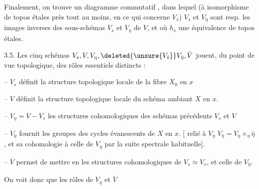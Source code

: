 
Finalement, on trouve un diagramme commutatif 
,
dans lequel  (à isomorphisme de topos étales près tout au moins, en ce qui concerne $V_{\bar s}$) $V_{\bar s}$ et $V_{\bar\eta}$ sont resp. les images inverses des sous-schémas  $V_s$ et $V_\eta$ de $V$,  et où $h_s$   une équivalence de topos étales.

3.5. Les  cinq schémas  $V_s,V,V_\eta,\deleted{\unsure{V_{\bar s}}}V_{\bar\eta},\bar V$ jouent, du point de vue topologique, des rôles essentiels distincts :

 -- $V_s$ définit la structure topologique locale de la fibre $X_0$ en $x$

-- $V$ définit la structure topologique locale du schéma ambiant $X$ en $x$.

-- $V_\eta=V-V_s$   les structures cohomologiques des schémas précédents $V_s$ et $V$

-- $V_{\bar\eta}$ fournit les  groupes des  cycles évanescents de $X$ en $x$. [  relié à $V_\eta$ $V_{\bar\eta}=V_\eta\times_\eta\bar\eta$, et sa cohomologie à celle de $V_\eta$ par la suite  spectrale habituelle].

-- $\bar V$ permet de mettre en  les structures cohomologiques de $V_s\simeq V_{\bar s}$, et celle de $V_{\bar\eta}$.

On voit donc que les rôles de $V_\eta$ et $\bar V$

